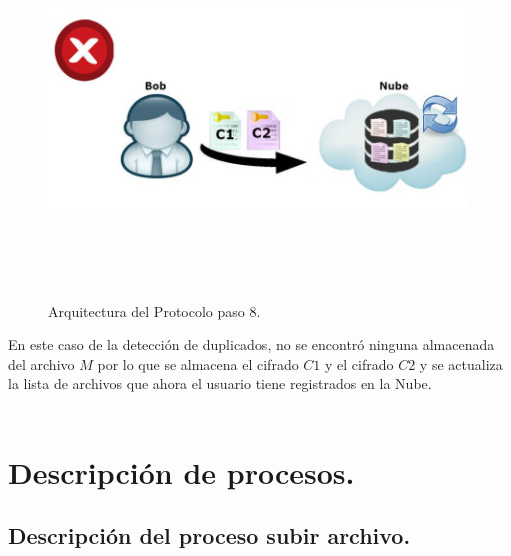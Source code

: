 \begin{figure}[H]
\centering
\includegraphics[width=16cm, height=10cm]{./images/Paso07.jpg}
\caption{Arquitectura del Protocolo paso 8.}

\end{figure}


En este caso de la detección de duplicados, no se encontró ninguna almacenada del archivo $M$ por lo que se almacena el cifrado $C1$ y el cifrado $C2$  y se actualiza la lista de archivos que ahora el usuario tiene registrados en la Nube.\\ \\

\section{Descripción de procesos. }

\subsection{Descripción del proceso subir archivo.}

